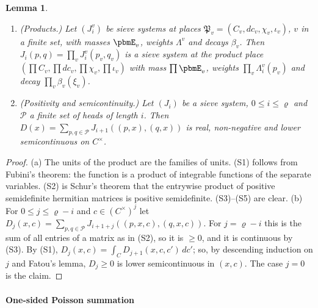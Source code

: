 \documentclass[10pt]{amsart}
\newtheorem{lemma}[theorem]{Lemma}
\theoremstyle{definition}
\theoremstyle{remark}
\begin{document}
\begin{lemma}\label{pbm:sysprop}
\begin{enumerate}
\item[(a)] \emph{(Products.)} Let $(J^v_i)$ be sieve systems at places $\mathfrak P_v=(C_v,dc_v,\chi_v,
\iota_v)$, $v$ in a finite set, with masses $\pbmE_v$, weights $\Lambda^v$ and decays $\beta_v$. Then
$J_i(p,q)=\prod_vJ^v_i(p_v,q_v)$ is a sieve system at the product place $(\prod C_v,\prod dc_v,\prod
\chi_v,\prod\iota_v)$ with mass $\prod\pbmE_v$, weights $\prod_v\Lambda^v_i(p_v)$ and decay $\prod_v
\beta_v(\xi_v)$.
\item[(b)] \emph{(Positivity and semicontinuity.)} Let $(J_i)$ be a sieve system, $0\le i\le\varrho$
and $\mathcal P$ a finite set of heads of length $i$. Then $D(x)=\sum_{p,q\in\mathcal P}J_{i+1}((p,x),
(q,x))$ is real, non-negative and lower semicontinuous on $C^\times$.
\end{enumerate}
\end{lemma}
\begin{proof}
(a) The units of the product are the families of units. (S1) follows from Fubini's theorem: the
function is a product of integrable functions of the separate variables. (S2) is Schur's theorem
that the entrywise product of positive semidefinite hermitian matrices is positive semidefinite.
(S3)--(S5) are clear. (b) For $0\le j\le\varrho-i$ and $c\in(C^\times)^j$ let $D_j(x,c)=\sum_{p,q\in
\mathcal P}J_{i+1+j}((p,x,c),(q,x,c))$. For $j=\varrho-i$ this is the sum of all entries of a matrix
as in (S2), so it is $\ge0$, and it is continuous by (S3). By (S1), $D_j(x,c)=\int_CD_{j+1}(x,c,c')
\,dc'$; so, by descending induction on $j$ and Fatou's lemma, $D_j\ge0$ is lower semicontinuous in
$(x,c)$. The case $j=0$ is the claim.
\end{proof}

\paragraph*{One-sided Poisson summation}
\end{document}
